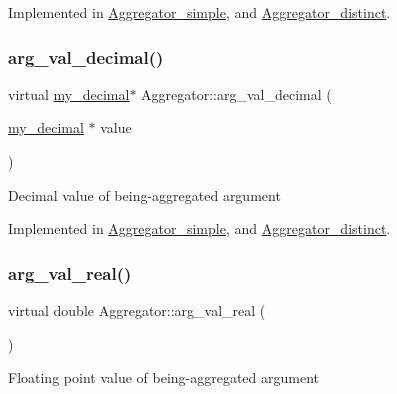 Implemented in \mbox{\hyperlink{classAggregator__simple_a89edab7b2334ef55dd1848094cdb4331}{Aggregator\+\_\+simple}}, and \mbox{\hyperlink{classAggregator__distinct_a213b0657e2fcd03305629d78c68b31ad}{Aggregator\+\_\+distinct}}.

\mbox{\label{classAggregator_a0965a66058cd00c581b015b9c571cb07}} 
\subsubsection{\texorpdfstring{arg\+\_\+val\+\_\+decimal()}{arg\_val\_decimal()}}
{\footnotesize\ttfamily virtual \mbox{\hyperlink{classmy__decimal}{my\+\_\+decimal}}$\ast$ Aggregator\+::arg\+\_\+val\+\_\+decimal (\begin{DoxyParamCaption}\item[{\mbox{\hyperlink{classmy__decimal}{my\+\_\+decimal}} $\ast$}]{value }\end{DoxyParamCaption})\hspace{0.3cm}{\ttfamily [pure virtual]}}

Decimal value of being-\/aggregated argument 

Implemented in \mbox{\hyperlink{classAggregator__simple_aeaf3d769df20c4c91476dd661da758f7}{Aggregator\+\_\+simple}}, and \mbox{\hyperlink{classAggregator__distinct_a60e5fc048746277c661ce97e9fc92905}{Aggregator\+\_\+distinct}}.

\mbox{\label{classAggregator_addca16d20f7cc2640f3843c2c5e7596d}} 
\subsubsection{\texorpdfstring{arg\+\_\+val\+\_\+real()}{arg\_val\_real()}}
{\footnotesize\ttfamily virtual double Aggregator\+::arg\+\_\+val\+\_\+real (\begin{DoxyParamCaption}{ }\end{DoxyParamCaption})\hspace{0.3cm}{\ttfamily [pure virtual]}}

Floating point value of being-\/aggregated argument 

